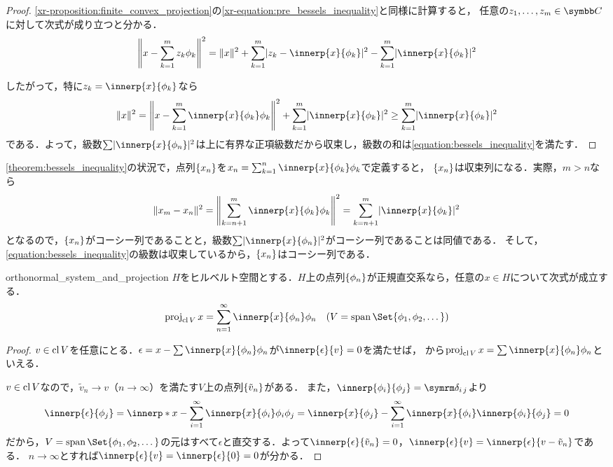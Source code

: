 \documentclass[../../main]{subfiles}
\begin{document}
\begin{proof}
  \cref{xr-proposition:finite_convex_projection}の\cref{xr-equation:pre_bessels_inequality}と同様に計算すると，
  任意の\(z_1,\dots,z_m\in\numset{C}\)に対して次式が成り立つと分かる．
  \[
    \vnorm*{x-\sum_{k=1}^mz_k\phi_k}^2 = \vnorm{x}^2+\sum_{k=1}^m\abs{z_k-\innerp{x}{\phi_k}}^2-\sum_{k=1}^m\abs{\innerp{x}{\phi_k}}^2
  \]

  したがって，特に\(z_k=\innerp{x}{\phi_k}\)なら
  \[
    \vnorm{x}^2 = \vnorm*{x-\sum_{k=1}^m\innerp{x}{\phi_k}\phi_k}^2+\sum_{k=1}^m\abs{\innerp{x}{\phi_k}}^2
    \geq \sum_{k=1}^m\abs{\innerp{x}{\phi_k}}^2
  \]
  である．よって，級数\(\sum\abs{\innerp{x}{\phi_n}}^2\)は上に有界な正項級数だから収束し，級数の和は\cref{equation:bessels_inequality}を満たす．
\end{proof}

\cref{theorem:bessels_inequality}の状況で，点列\(\lbrace x_n\rbrace\)を\(x_n=\sum_{k=1}^n\innerp{x}{\phi_k}\phi_k\)で定義すると，
\(\lbrace x_n\rbrace\)は収束列になる．実際，\(m>n\)なら
\[
  \vnorm{x_m-x_n}^2 = \vnorm*{\sum_{k=n+1}^m\innerp{x}{\phi_k}\phi_k}^2
  = \sum_{k=n+1}^m\abs{\innerp{x}{\phi_k}}^2
\]
となるので，\(\lbrace x_n\rbrace\)がコーシー列であることと，級数\(\sum\abs{\innerp{x}{\phi_n}}^2\)がコーシー列であることは同値である．
そして，\cref{equation:bessels_inequality}の級数は収束しているから，\(\lbrace x_n\rbrace\)はコーシー列である．

\begin{proposition}{}{orthonormal_system_and_projection}
  \(H\)をヒルベルト空間とする．\(H\)上の点列\(\lbrace\phi_n\rbrace\)が正規直交系なら，任意の\(x\in H\)について次式が成立する．
  \[
    \proj_{\clsr V}x = \sum_{n=1}^\infty\innerp{x}{\phi_n}\phi_n\quad(V=\spannedby\Set{\phi_1,\phi_2,\dotsc})
  \]
\end{proposition}

\begin{proof}
  \(v\in\operatorname{cl} V\)を任意にとる．\(\epsilon=x-\sum\innerp{x}{\phi_n}\phi_n\)が\(\innerp{\epsilon}{v}=0\)を満たせば，
  から\(\proj_{\clsr V}x=\sum\innerp{x}{\phi_n}\phi_n\)といえる．

  \(v\in\operatorname{cl} V\)なので，\(\tilde{v}_n\to v\)（\(n\to\infty\)）を満たす\(V\)上の点列\(\lbrace\tilde{v}_n\rbrace\)がある．
  また，\(\innerp{\phi_i}{\phi_j}=\kdelta{i}{j}\)より
  \[
    \innerp{\epsilon}{\phi_j} = \innerp*{x-\sum_{i=1}^\infty\innerp{x}{\phi_i}\phi_i}{\phi_j}
    = \innerp{x}{\phi_j}-\sum_{i=1}^\infty\innerp{x}{\phi_i}\innerp{\phi_i}{\phi_j}
    = 0
  \]
  だから，\(V=\spannedby\Set{\phi_1,\phi_2,\dotsc}\)の元はすべて\(\epsilon\)と直交する．よって\(\innerp{\epsilon}{\tilde{v}_n}=0\)，\(\innerp{\epsilon}{v}=\innerp{\epsilon}{v-\tilde{v}_n}\)である．
  \(n\to\infty\)とすれば\(\innerp{\epsilon}{v}=\innerp{\epsilon}{0}=0\)が分かる．
\end{proof}
\end{document}
